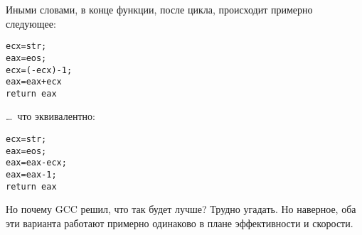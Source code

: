Иными словами, в конце функции, после цикла, происходит примерно следующее: 

\begin{lstlisting}
ecx=str;
eax=eos;
ecx=(-ecx)-1; 
eax=eax+ecx
return eax
\end{lstlisting}

\dots~что эквивалентно:

\begin{lstlisting}
ecx=str;
eax=eos;
eax=eax-ecx;
eax=eax-1;
return eax
\end{lstlisting}

Но почему GCC решил, что так будет лучше? Трудно угадать.
Но наверное, оба эти варианта работают примерно одинаково в плане эффективности и скорости.
